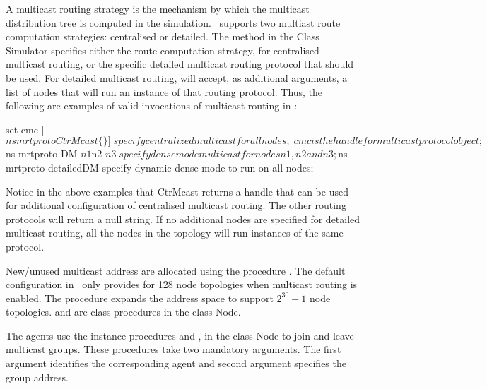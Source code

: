 A multicast routing strategy is the mechanism by which
the multicast distribution tree is computed in the simulation.
\ns\ supports two multiast route computation strategies:
	centralised or detailed.
The method  in the Class Simulator specifies
either the route computation strategy, for centralised multicast routing,
or the specific detailed multicast routing protocol that should be used.
For detailed multicast routing,  will accept,
as additional arguments, a list of nodes
that will run an instance of that routing protocol.
Thus, the following are examples of
valid invocations of multicast routing in \ns:
\begin{program}
        set cmc [$ns mrtproto CtrMcast \{\}]    \; specify centralized multicast for all nodes;
        \; cmc is the handle for multicast protocol object;
        $ns mrtproto DM $n1 $n2 $n3 \; specify dense mode multicast for nodes n1, n2 and n3;
        $ns mrtproto detailedDM                  \; specify dynamic dense mode to run on all nodes;
\end{program}
Notice in the above examples that CtrMcast returns a handle that
can be used for additional configuration of centralised multicast routing.
The other routing protocols will return a null string.
If no additional nodes are specified for detailed multicast routing,
all the nodes in the topology will run instances of the same protocol.

New/unused multicast address are allocated using the procedure
.
The default configuration in \ns\ only provides for
128 node topologies when multicast routing is enabled.
The procedure 
expands the address space to support $2^{30} - 1$ node topologies.
 and  are class
procedures in the class Node.

The agents use the instance procedures
 and , in
the class Node to join and leave multicast groups. These procedures
take two mandatory arguments. The first argument identifies the
corresponding agent and second argument specifies the group address.

